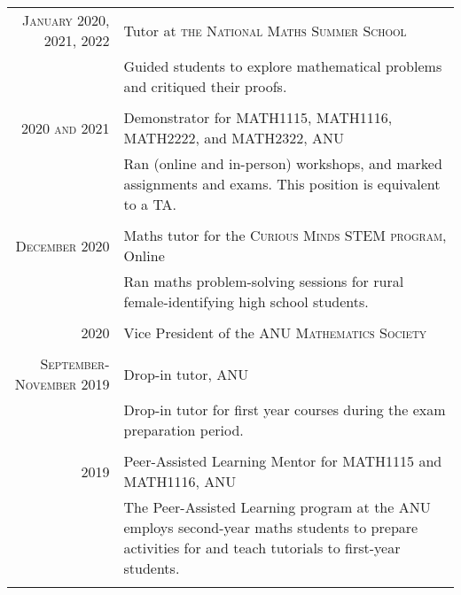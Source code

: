 \documentclass[a4paper,10pt]{article} %
\begin{document}
\begin{tabular}{r|p{12cm}}

\textsc{January 2020, 2021, 2022} & Tutor at \textsc{the National Maths Summer School} \emph{}\\
& \footnotesize{Guided students to explore mathematical problems and critiqued their proofs.}\\
\multicolumn{2}{c}{} \\


\textsc{2020 and 2021} & Demonstrator for \textsc{MATH1115, MATH1116, MATH2222}, and \textsc{MATH2322}, ANU \emph{}\\
& \footnotesize{Ran (online and in-person) workshops, and marked assignments and exams. This position is equivalent to a TA.}\\
\multicolumn{2}{c}{} \\


\textsc{December 2020} & Maths tutor for the \textsc{Curious Minds STEM program}, Online \emph{}\\
& \footnotesize{Ran maths problem-solving sessions for rural female-identifying high school students.}\\
\multicolumn{2}{c}{} \\


\textsc{2020} & Vice President of the \textsc{ANU Mathematics Society}\\
\multicolumn{2}{c}{} \\


\textsc{September-November 2019} & Drop-in tutor, ANU \emph{}\\
& \footnotesize{Drop-in tutor for first year courses during the exam preparation period.}\\
\multicolumn{2}{c}{} \\


\textsc{2019} & Peer-Assisted Learning Mentor for \textsc{MATH1115} and \textsc{MATH1116}, ANU \emph{}\\
& \footnotesize{The Peer-Assisted Learning program at the ANU employs second-year maths students to prepare activities for and teach tutorials to first-year students.}\\
\multicolumn{2}{c}{} \\


\end{tabular}
\end{document}
